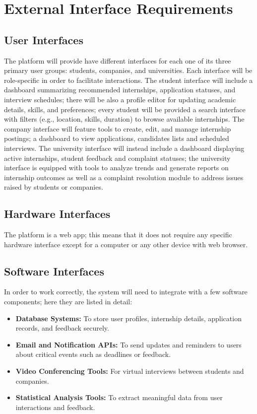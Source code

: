 \section{External Interface Requirements}
\label{sec:external_interface_requirements}%

\subsection{User Interfaces}
\label{subsec:user_interfaces}%
The platform will provide have different interfaces for each one of its three primary user groups: students, companies, and universities. Each interface will be role-specific in order to facilitate interactions. The student interface will include a dashboard summarizing recommended internships, application statuses, and interview schedules; there will be also a profile editor for updating academic details, skills, and preferences; every student will be provided a search interface with filters (e.g., location, skills, duration) to browse available internships. The company interface will feature tools to create, edit, and manage internship postings; a dashboard to view applications, candidates lists  and scheduled interviews. The university interface will instead include a dashboard displaying active internships, student feedback and complaint statuses; the university interface is equipped with tools to analyze trends and generate reports on internship outcomes as well as a complaint resolution module to address issues raised by students or companies.

\subsection{Hardware Interfaces}
\label{subsec:hardware_interfaces}%
The platform is a web app; this means that it does not require any specific hardware interface except for a computer or any other device with web browser.  
\subsection{Software Interfaces}
\label{subsec:software_interfaces}%
In order to work correctly, the system will need to integrate with a few software components; here they are listed in detail:
\begin{itemize}
    \item \textbf{Database Systems:} To store user profiles, internship details, application records, and feedback securely.
    \item \textbf{Email and Notification APIs:} To send updates and reminders to users about critical events such as deadlines or feedback.
    \item \textbf{Video Conferencing Tools:} For virtual interviews between students and companies.
    \item \textbf{Statistical Analysis Tools:} To extract meaningful data from user interactions and feedback.
\end{itemize}
 
